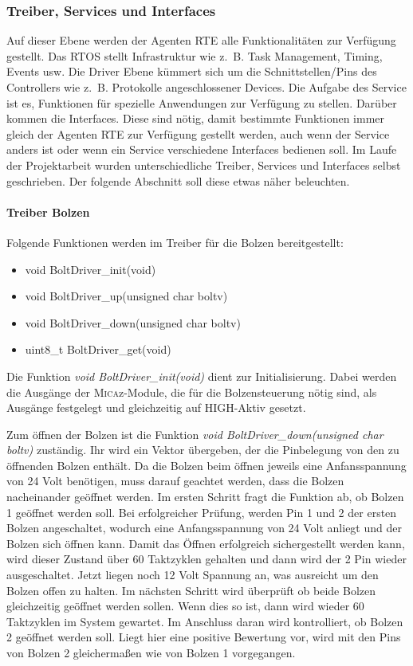 \subsubsection{Treiber, Services und Interfaces}
Auf dieser Ebene werden der Agenten RTE alle Funktionalitäten zur Verfügung gestellt. Das RTOS stellt Infrastruktur wie z.~B. Task Management, Timing, Events usw.
Die Driver Ebene kümmert sich um die Schnittstellen/Pins des Controllers wie z.~B. Protokolle angeschlossener
Devices\cite[S. 26]{Stasch:Hahn}. Die Aufgabe des Service ist es, Funktionen für spezielle Anwendungen zur Verfügung zu stellen.
Darüber kommen die Interfaces. Diese sind nötig, damit bestimmte Funktionen immer gleich der Agenten RTE zur Verfügung gestellt werden, auch wenn der Service anders ist oder wenn ein Service verschiedene Interfaces bedienen soll\cite[S. 26]{Stasch:Hahn}. Im Laufe der Projektarbeit wurden unterschiedliche Treiber, Services und Interfaces selbst geschrieben. Der folgende Abschnitt soll diese etwas näher beleuchten.

\paragraph{Treiber Bolzen}
Folgende Funktionen werden im Treiber für die Bolzen bereitgestellt:
\begin{itemize}
  \item void BoltDriver\_init(void)
  \item void BoltDriver\_up(unsigned char boltv)
  \item void BoltDriver\_down(unsigned char boltv)
  \item uint8\_t BoltDriver\_get(void)
\end{itemize} 
Die Funktion \textit{void BoltDriver\_init(void)} dient zur Initialisierung. Dabei werden die Ausgänge der \textsc{Mica}z-Module, die für die Bolzensteuerung nötig sind, als Ausgänge festgelegt und gleichzeitig auf HIGH-Aktiv gesetzt.

Zum öffnen der Bolzen ist die Funktion \textit{void BoltDriver\_down(unsigned char boltv)} zuständig. Ihr wird ein Vektor übergeben, der die Pinbelegung von den zu öffnenden Bolzen enthält. Da die Bolzen beim öffnen jeweils eine Anfansspannung von 24 Volt benötigen, muss darauf geachtet werden, dass die Bolzen nacheinander geöffnet werden. Im ersten Schritt fragt die Funktion ab, ob Bolzen 1 geöffnet werden soll. Bei erfolgreicher Prüfung, werden Pin 1 und 2 der ersten Bolzen angeschaltet, wodurch eine Anfangsspannung von 24 Volt anliegt und der Bolzen sich öffnen kann. Damit das Öffnen erfolgreich sichergestellt werden kann, wird dieser Zustand über 60 Taktzyklen gehalten und dann wird der 2 Pin wieder ausgeschaltet. Jetzt liegen noch 12 Volt Spannung an, was ausreicht um den Bolzen offen zu halten. Im nächsten Schritt wird überprüft ob beide Bolzen gleichzeitig geöffnet werden sollen. Wenn dies so ist, dann wird wieder 60 Taktzyklen im System gewartet. Im Anschluss daran wird kontrolliert, ob Bolzen 2 geöffnet werden soll. Liegt hier eine positive Bewertung vor, wird mit den Pins von Bolzen 2 gleichermaßen wie von Bolzen 1 vorgegangen.

